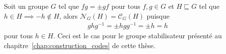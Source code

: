 Soit un groupe $G$ tel que $fg = \pm gf$ pour tous $f,g \in G$
et $H \sqsubseteq G$ tel que $h \in H \implies -h \not\in H$,
alors $\mathcal{N}_G(H) = \mathcal{C}_G(H)$ puisque
\begin{align}
  ghg^{-1} = \pm hgg^{-1} = \pm h = h
\end{align}
pour tous $h \in H$.
Ceci est le cas pour le groupe stabilisateur présenté au chapitre~\ref{chap:construction_codes}
de cette thèse.
